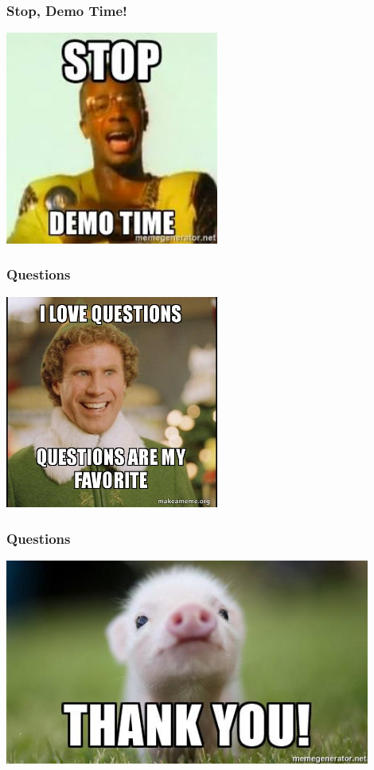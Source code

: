 \documentclass[aspectratio=169]{beamer}
\begin{document}
\begin{frame}
  \frametitle{Stop, Demo Time!}
  \begin{center}
    \includegraphics[width=7cm,keepaspectratio]{demo_meme}
  \end{center}
\end{frame}

\begin{frame}
  \frametitle{Questions}
  \begin{center}
    \includegraphics[width=7cm,keepaspectratio]{questions}
  \end{center}
\end{frame}

\begin{frame}
  \frametitle{Questions}
  \begin{center}
    \includegraphics[width=12cm,keepaspectratio]{thank_you}
  \end{center}
\end{frame}
\end{document}
